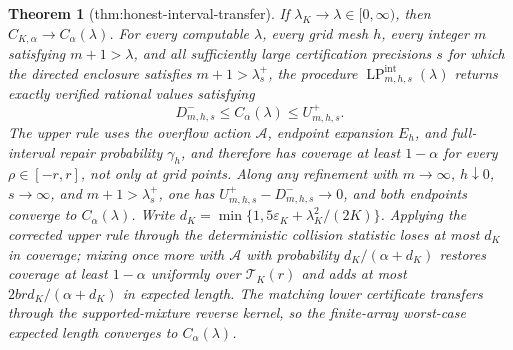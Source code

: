 \documentclass{article}
\newtheorem{theorem}{Theorem}
\begin{document}
\begin{theorem}[thm:honest-interval-transfer]\label{thm:honest-interval-transfer}
If \(\lambda_K\to\lambda\in[0,\infty)\), then
\(C_{K,\alpha}\to C_\alpha(\lambda)\).  For every computable
\(\lambda\), every grid mesh \(h\), every integer \(m\) satisfying
\(m+1>\lambda\), and all sufficiently large certification precisions
\(s\) for which the directed enclosure satisfies
\(m+1>\lambda_s^+\), the procedure
\(\operatorname{LP}_{m,h,s}^{\mathrm{int}}(\lambda)\) returns exactly
verified rational values satisfying
\[
 D_{m,h,s}^-\le C_\alpha(\lambda)\le U_{m,h,s}^+.
\]
The upper rule uses the overflow action \(\mathcal A\), endpoint
expansion \(E_h\), and full-interval repair probability \(\gamma_h\),
and therefore has coverage at least \(1-\alpha\) for every
\(\rho\in[-r,r]\), not only at grid points.  Along any refinement with
\(m\to\infty\), \(h\downarrow0\), \(s\to\infty\), and
\(m+1>\lambda_s^+\), one has
\(U_{m,h,s}^+-D_{m,h,s}^-\to0\), and both endpoints converge to
\(C_\alpha(\lambda)\).  Write
\(d_K=\min\{1,5\varepsilon_K+\lambda_K^2/(2K)\}\).  Applying the
corrected upper rule through the deterministic collision statistic
loses at most \(d_K\) in coverage; mixing once more with
\(\mathcal A\) with probability \(d_K/(\alpha+d_K)\) restores coverage
at least \(1-\alpha\) uniformly over \(\mathcal T_K(r)\) and adds at
most \(2brd_K/(\alpha+d_K)\) in expected length.  The matching lower
certificate transfers through the supported-mixture reverse kernel,
so the finite-array worst-case expected length converges to
\(C_\alpha(\lambda)\).
\end{theorem}
\end{document}
